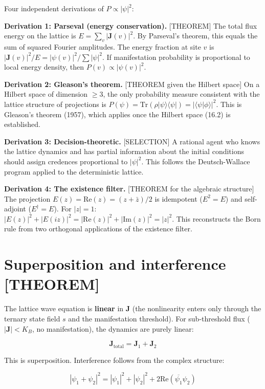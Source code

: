 \documentclass[
  11pt,
  letterpaper,
  twoside,
  openany]{book}
\makeatletter
\let\orig@section\section
\renewcommand{\section}{\needspace{8\baselineskip}\orig@section}
\makeatother
\begin{document}
Four independent derivations of \(P \propto |\psi|^2\):

\textbf{Derivation 1: Parseval (energy conservation).} {[}THEOREM{]} The
total flux energy on the lattice is \(E = \sum_v |\mathbf{J}(v)|^2\). By
Parseval's theorem, this equals the sum of squared Fourier amplitudes.
The energy fraction at site \(v\) is
\(|\mathbf{J}(v)|^2 / E = |\psi(v)|^2 / \sum |\psi|^2\). If
manifestation probability is proportional to local energy density, then
\(P(v) \propto |\psi(v)|^2\).

\textbf{Derivation 2: Gleason's theorem.} {[}THEOREM given the Hilbert
space{]} On a Hilbert space of dimension \(\geq 3\), the only
probability measure consistent with the lattice structure of projections
is
\(P(\psi) = \text{Tr}(\rho |\psi\rangle\langle\psi|) = |\langle\psi|\phi\rangle|^2\).
This is Gleason's theorem (1957), which applies once the Hilbert space
(16.2) is established.

\textbf{Derivation 3: Decision-theoretic.} {[}SELECTION{]} A rational
agent who knows the lattice dynamics and has partial information about
the initial conditions should assign credences proportional to
\(|\psi|^2\). This follows the Deutsch-Wallace program applied to the
deterministic lattice.

\textbf{Derivation 4: The existence filter.} {[}THEOREM for the
algebraic structure{]} The projection
\(E(z) = \text{Re}(z) = (z + \bar{z})/2\) is idempotent (\(E^2 = E\))
and self-adjoint (\(E^\dagger = E\)). For \(|z| = 1\):
\(|E(z)|^2 + |E(iz)|^2 = |\text{Re}(z)|^2 + |\text{Im}(z)|^2 = |z|^2\).
This reconstructs the Born rule from two orthogonal applications of the
existence filter.

\section{Superposition and interference
{[}THEOREM{]}}\label{superposition-and-interference-theorem}

The lattice wave equation is \textbf{linear} in \(\mathbf{J}\) (the
nonlinearity enters only through the ternary state field \(s\) and the
manifestation threshold). For sub-threshold flux
(\(|\mathbf{J}| < K_B\), no manifestation), the dynamics are purely
linear:

\[
\mathbf{J}_{\text{total}} = \mathbf{J}_1 + \mathbf{J}_2
\tag{16.5}
\]

This is superposition. Interference follows from the complex structure:

\[
|\psi_1 + \psi_2|^2 = |\psi_1|^2 + |\psi_2|^2 + 2\text{Re}(\overline{\psi_1}\psi_2)
\tag{16.6}
\]
\end{document}
